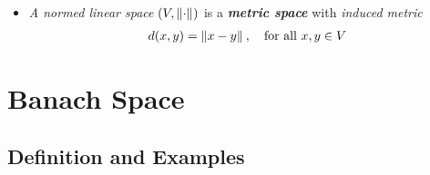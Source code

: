 \documentclass[11pt]{article}
\begin{document}
\begin{itemize}
\item \begin{remark}
\emph{A normed linear space} $(V, \left\|\cdot\right\|_{})$ is a \emph{\textbf{metric space}} with \emph{induced metric }
\begin{align*}
d(x, y) = \left\|x - y\right\|_{}, \quad \text{for all } x, y \in V
\end{align*}
\end{remark}
\end{itemize}

\section{Banach Space}
\subsection{Definition and Examples}
\end{document}
